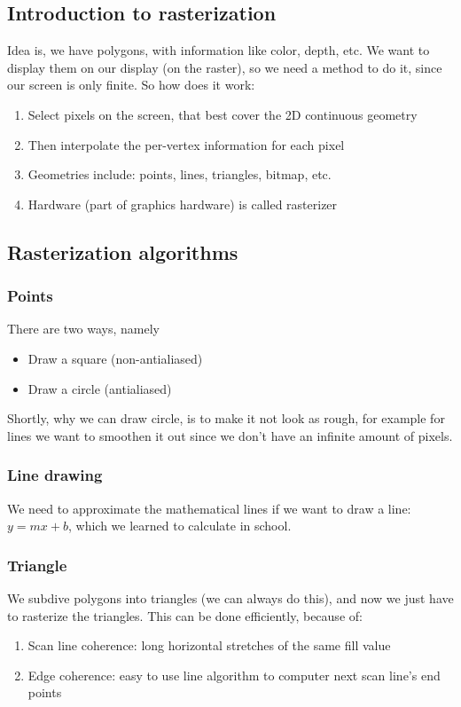 \documentclass[11pt]{article}
\begin{document}
\subsection{Introduction to rasterization}
Idea is, we have polygons, with information like color, depth, etc. We want to display them on our display (on the raster), so we need a method to do it, since our screen is only finite.
So how does it work:
\begin{enumerate}
    \item Select pixels on the screen, that best cover the 2D continuous geometry
    \item Then interpolate the per-vertex information for each pixel
    \item Geometries include: points, lines, triangles, bitmap, etc.
    \item Hardware (part of graphics hardware) is called rasterizer
\end{enumerate}

\subsection{Rasterization algorithms}
\subsubsection*{Points}
There are two ways, namely
\begin{itemize}
    \item Draw a square (non-antialiased)
    \item Draw a circle (antialiased)
\end{itemize}

Shortly, why we can draw circle, is to make it not look as rough, for example for lines we want to smoothen it out since we don't have an infinite amount of pixels.

\subsubsection*{Line drawing}
We need to approximate the mathematical lines if we want to draw a line: $y = mx + b$, which we learned to calculate in school.



\subsubsection*{Triangle}
We subdive polygons into triangles (we can always do this), and now we just have to rasterize the triangles.
This can be done efficiently, because of:
\begin{enumerate}
    \item Scan line coherence: long horizontal stretches of the same fill value
    \item Edge coherence: easy to use line algorithm to computer next scan line's end points
\end{enumerate}
\end{document}
